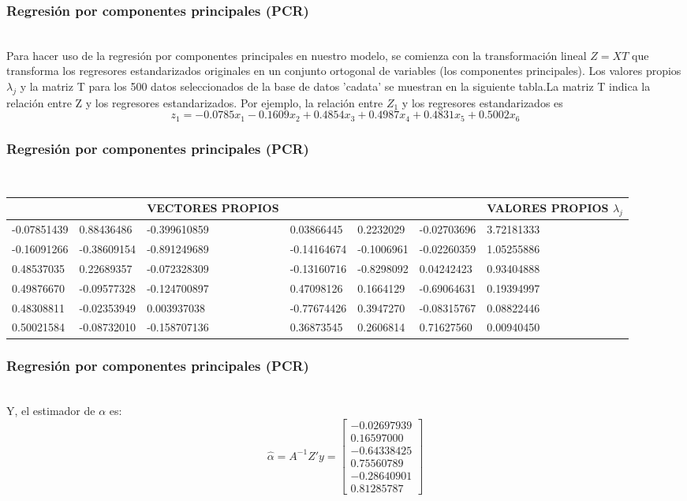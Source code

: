 \documentclass[12pt]{beamer}
\begin{document}
\begin{frame}
\frametitle{Regresión por componentes principales (PCR)}
~\\Para hacer uso de la regresión por componentes principales en nuestro modelo, se comienza con la transformación lineal $Z=XT$ que transforma los regresores estandarizados originales en un conjunto ortogonal de variables (los componentes principales). Los valores propios $\lambda_{j}$ y la matriz T para los 500 datos seleccionados de la base de datos 'cadata' se muestran en la siguiente tabla.La matriz T indica la relación entre Z y los regresores estandarizados. Por ejemplo, la relación entre $Z_{1}$ y los regresores estandarizados es 
$$z_{1}=-0.0785x_{1}-0.1609x_{2}+0.4854x_{3}+0.4987x_{4}+0.4831x_{5}+0.5002x_{6}$$
\end{frame}

\begin{frame}
\frametitle{Regresión por componentes principales (PCR)}
~\\\begin{tabular}{p{1.8cm}p{1.8cm}p{2cm}p{1.8cm}p{1.8cm}p{1.8cm}|p{2.5cm}}
\hline 
 &  & VECTORES PROPIOS &  &  &  & VALORES PROPIOS $\lambda_{j}$ \\ 
\hline 
-0.07851439 & 0.88436486 & -0.399610859 & 0.03866445 & 0.2232029 & -0.02703696 & 3.72181333 \\  
-0.16091266 & -0.38609154 & -0.891249689 & -0.14164674 & -0.1006961 & -0.02260359 & 1.05255886 \\  
0.48537035 & 0.22689357 & -0.072328309 & -0.13160716 & -0.8298092 & 0.04242423 & 0.93404888 \\  
0.49876670 & -0.09577328 & -0.124700897 & 0.47098126 & 0.1664129 & -0.69064631 & 0.19394997 \\  
0.48308811 & -0.02353949 & 0.003937038 & -0.77674426 & 0.3947270 & -0.08315767 & 0.08822446 \\  
0.50021584 & -0.08732010 & -0.158707136 & 0.36873545 & 0.2606814 & 0.71627560 & 0.00940450 \\ 
\hline 
\end{tabular} 
\end{frame}

\begin{frame}
\frametitle{Regresión por componentes principales (PCR)}
~\\Y, el estimador de $\alpha$ es:
 $$\hat{\alpha}=A^{-1}Z'y=\left[\begin{matrix}
 -0.02697939 \\ 
 0.16597000 \\ 
 -0.64338425 \\ 
 0.75560789 \\ 
 -0.28640901 \\ 
 0.81285787
 \end{matrix}\right]$$
\end{frame}
\end{document}
